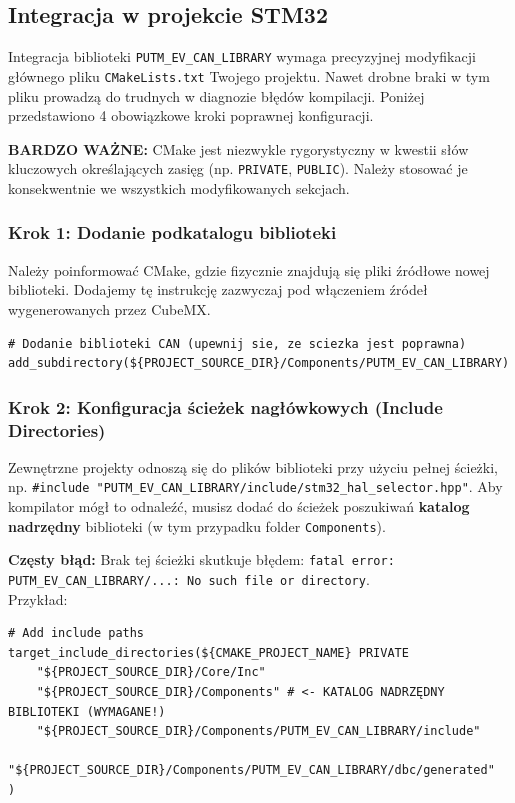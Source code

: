 \documentclass[a4paper,11pt]{article}
\begin{document}
\begin{stm32box}
\subsection*{Integracja w projekcie STM32}

Integracja biblioteki \texttt{PUTM\_EV\_CAN\_LIBRARY} wymaga precyzyjnej modyfikacji głównego pliku \texttt{CMakeLists.txt} Twojego projektu. Nawet drobne braki w tym pliku prowadzą do trudnych w diagnozie błędów kompilacji. Poniżej przedstawiono 4 obowiązkowe kroki poprawnej konfiguracji.

\textcolor{warningred}{\textbf{BARDZO WAŻNE:}} CMake jest niezwykle rygorystyczny w kwestii słów kluczowych określających zasięg (np. \texttt{PRIVATE}, \texttt{PUBLIC}). Należy stosować je konsekwentnie we wszystkich modyfikowanych sekcjach.

\subsubsection*{Krok 1: Dodanie podkatalogu biblioteki}
Należy poinformować CMake, gdzie fizycznie znajdują się pliki źródłowe nowej biblioteki. Dodajemy tę instrukcję zazwyczaj pod włączeniem źródeł wygenerowanych przez CubeMX.

\begin{lstlisting}[style=cmakestyle]
# Dodanie biblioteki CAN (upewnij sie, ze sciezka jest poprawna)
add_subdirectory(${PROJECT_SOURCE_DIR}/Components/PUTM_EV_CAN_LIBRARY)
\end{lstlisting}

\subsubsection*{Krok 2: Konfiguracja ścieżek nagłówkowych (Include Directories)}
Zewnętrzne projekty odnoszą się do plików biblioteki przy użyciu pełnej ścieżki, np. \texttt{\#include "PUTM\_EV\_CAN\_LIBRARY/include/stm32\_hal\_selector.hpp"}. Aby kompilator mógł to odnaleźć, musisz dodać do ścieżek poszukiwań \textbf{katalog nadrzędny} biblioteki (w tym przypadku folder \texttt{Components}).

\textcolor{warningred}{\textbf{Częsty błąd:}} Brak tej ścieżki skutkuje błędem: \texttt{fatal error: PUTM\_EV\_CAN\_LIBRARY/...: No such file or directory}.
\\Przykład:
\begin{lstlisting}[style=cmakestyle]
# Add include paths
target_include_directories(${CMAKE_PROJECT_NAME} PRIVATE
    "${PROJECT_SOURCE_DIR}/Core/Inc"
    "${PROJECT_SOURCE_DIR}/Components" # <- KATALOG NADRZĘDNY BIBLIOTEKI (WYMAGANE!)
    "${PROJECT_SOURCE_DIR}/Components/PUTM_EV_CAN_LIBRARY/include"
    "${PROJECT_SOURCE_DIR}/Components/PUTM_EV_CAN_LIBRARY/dbc/generated"
)
\end{lstlisting}


\end{stm32box}
\end{document}
